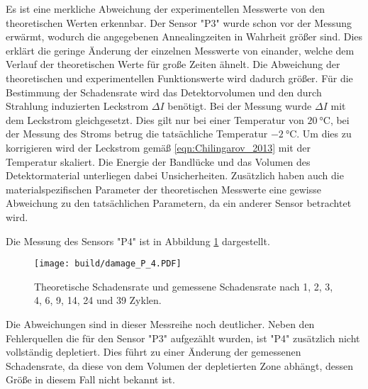 Es ist eine merkliche Abweichung der experimentellen Messwerte von den theoretischen
Werten erkennbar. Der Sensor "P3" wurde schon vor der Messung erwärmt, wodurch
die angegebenen Annealingzeiten in Wahrheit größer sind. Dies erklärt die
geringe Änderung der einzelnen Messwerte von einander, welche dem
Verlauf der theoretischen Werte für große Zeiten ähnelt. Die Abweichung der theoretischen
und experimentellen Funktionswerte wird dadurch größer.
Für die Bestimmung der Schadensrate wird das Detektorvolumen und den durch
Strahlung induzierten Leckstrom $\Delta I$ benötigt. Bei der Messung wurde
$\Delta I$ mit dem Leckstrom gleichgesetzt. Dies gilt nur bei einer Temperatur
von $\SI{20}{\celsius}$, bei der Messung des Stroms betrug die tatsächliche Temperatur
$\SI{-2}{\celsius}$. Um dies zu korrigieren wird der Leckstrom gemäß \ref{eqn:Chilingarov_2013}
mit der Temperatur skaliert. Die Energie der Bandlücke und das Volumen des Detektormaterial
unterliegen dabei Unsicherheiten. Zusätzlich haben auch die materialspezifischen Parameter
der theoretischen Messwerte eine gewisse Abweichung zu den tatsächlichen Parametern, da
ein anderer Sensor betrachtet wird.

Die Messung des Sensors "P4" ist in Abbildung \ref{fig:P_4}
dargestellt.

\begin{figure}
    \texttt{[image: build/damage\_P\_4.PDF]}
\caption{Theoretische Schadensrate und gemessene Schadensrate nach 1, 2, 3, 4, 6, 9, 14, 24 und 39 Zyklen.}
\label{fig:P_4}
\end{figure}

Die Abweichungen sind in dieser Messreihe noch deutlicher. Neben den Fehlerquellen die
für den Sensor "P3" aufgezählt wurden, ist "P4" zusätzlich nicht vollständig depletiert.
Dies führt zu einer Änderung der gemessenen Schadensrate, da diese von dem Volumen
der depletierten Zone abhängt, dessen Größe in diesem Fall nicht bekannt ist.
